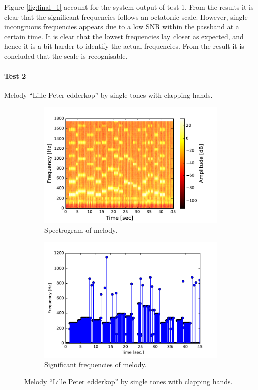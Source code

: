 Figure \ref{fig:final_1} account for the system output of test 1. From the results it is clear that the significant frequencies follows an octatonic scale. However, single incongruous frequencies appears due to a low SNR within the passband at a certain time.
It is clear that the lowest frequencies lay closer as expected, and hence it is a bit harder to identify the actual frequencies. From the result it is concluded that the scale is recognisable.

\paragraph{Test 2} Melody ``Lille Peter edderkop'' by single tones with clapping hands.  
\begin{figure}[H]
\centering
\begin{subfigure}{0.49\textwidth}
\centering
\includegraphics[width=\textwidth]{figures/validation/systemtest/final_spec3.pdf}
\caption{Spectrogram of melody.}
\label{fig:final_spec2}
\end{subfigure}
\begin{subfigure}{0.49\textwidth}
\centering
\includegraphics[width=\textwidth]{figures/validation/systemtest/final_peak3.pdf}
\caption{Significant frequencies of melody.}
\label{fig:final_peak3}
\end{subfigure}
\caption{Melody ``Lille Peter edderkop'' by single tones with clapping hands.}
\label{fig:final_3}
\end{figure}  

